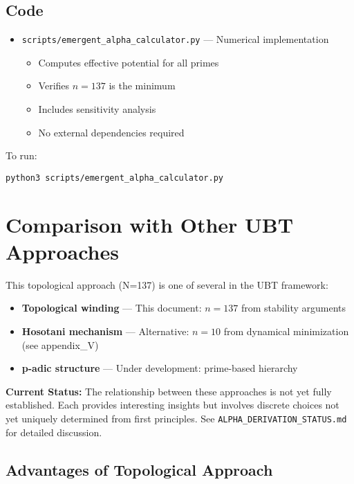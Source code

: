 \documentclass[12pt, a4paper]{article}
\begin{document}
\subsection{Code}

\begin{itemize}
\item \texttt{scripts/emergent\_alpha\_calculator.py} — Numerical implementation
  \begin{itemize}
  \item Computes effective potential for all primes
  \item Verifies $n = 137$ is the minimum
  \item Includes sensitivity analysis
  \item No external dependencies required
  \end{itemize}
\end{itemize}

To run:
\begin{verbatim}
python3 scripts/emergent_alpha_calculator.py
\end{verbatim}

\section{Comparison with Other UBT Approaches}

This topological approach (N=137) is one of several in the UBT framework:

\begin{itemize}
\item \textbf{Topological winding} — This document: $n=137$ from stability arguments
\item \textbf{Hosotani mechanism} — Alternative: $n=10$ from dynamical minimization (see appendix\_V)
\item \textbf{p-adic structure} — Under development: prime-based hierarchy
\end{itemize}

\textbf{Current Status:} The relationship between these approaches is not yet fully established. Each provides interesting insights but involves discrete choices not yet uniquely determined from first principles. See \texttt{ALPHA\_DERIVATION\_STATUS.md} for detailed discussion.

\subsection{Advantages of Topological Approach}
\end{document}
